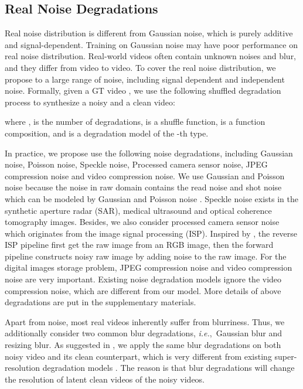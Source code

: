\documentclass[10pt,twocolumn,letterpaper]{article}
\def\ie{\mbox{\textit{i.e.}, }}
\newlength \g
\begin{document}
\newpage
\subsection{Real Noise Degradations}
Real noise distribution is different from Gaussian noise, which is purely additive and signal-dependent.
Training on Gaussian noise may have poor performance on real noise distribution.
Real-world videos often contain unknown noises and blur, and they differ from video to video. 
To cover the real noise distribution, we propose to a large range of noise, including signal dependent and independent noise.
Formally, given a GT video , we use the following shuffled degradation process to synthesize a noisy and a clean video: 

where ,  is the number of degradations,  is a shuffle function,  is a function composition, and  is a degradation model of the -th type. 

In practice, we propose use the following noise degradations, including
Gaussian noise, Poisson noise, Speckle noise, Processed camera sensor noise, JPEG compression noise and video compression noise.
We use Gaussian and Poisson noise because the noise in raw domain contains the read noise and shot noise which can be modeled by Gaussian and Poisson noise \cite{foi2008practical,mildenhall2018burst}.
Speckle noise exists in the synthetic aperture radar (SAR), medical ultrasound and optical coherence tomography images.
Besides, we also consider processed camera sensor noise which originates from the image signal processing (ISP). Inspired by \cite{zhang2022scunet}, the reverse ISP pipeline first get the raw image from an RGB image, then the forward pipeline constructs noisy raw image by adding noise to the raw image.
For the digital images storage problem, JPEG compression noise and video compression noise are very important.
Existing noise degradation models ignore the video compression noise, which are different from our model.
More details of above degradations are put in the supplementary materials.



Apart from noise, most real videos inherently suffer from blurriness.
Thus, we additionally consider two common blur degradations, \ie Gaussian blur and resizing blur.
As suggested in \cite{zhang2022scunet}, we apply the same blur degradations on both noisy video and its clean counterpart, which is very different from existing super-resolution degradation models \cite{zhang2021designing,wang2021realesrgan}.  
The reason is that blur degradations will change the resolution of latent clean videos of the noisy videos.
\end{document}
